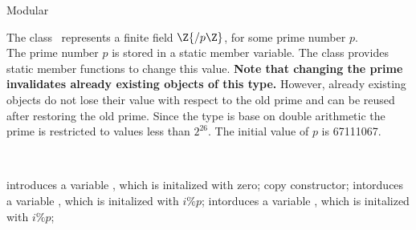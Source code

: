\begin{ccRefClass} {Modular}
\label{Modular}

\def\ccTagOperatorLayout{\ccFalse}

\ccDefinition

The class \ccRefName\ represents a finite field $\Z{/p\Z}$, 
for some prime number $p$. \\

The prime number $p$ is stored in a static member variable. 
The class provides static member functions to change this value. 
{\bf Note that changing the prime invalidates already existing objects 
of this type.}
However, already existing objects do not lose their value with respect to the 
old prime and can be reused after restoring the old prime. 
Since the type is base on double 
arithmetic the prime is restricted to values less than $2^{26}$. 
The initial value of $p$ is 67111067. 


\ccIsModel
{}\\


\ccCreation
{}

{introduces a variable \ccVar, which is initalized with zero;}
\ccGlue
{}
{copy constructor;}
\ccGlue
{}
{intorduces a variable \ccVar, which is initalized with $i \%  p$;}
\ccGlue
{}
{intorduces a variable \ccVar, which is initalized with $i \%  p$;}

\ccOperations

\ccGlue
{}
\ccGlue
{}


\ccGlue
{}\ccGlue

\ccGlue
{}\ccGlue
{}\ccGlue
{}\ccGlue

\ccGlue
{}\ccGlue
{}\ccGlue
{}\ccGlue

\end{ccRefClass} 
